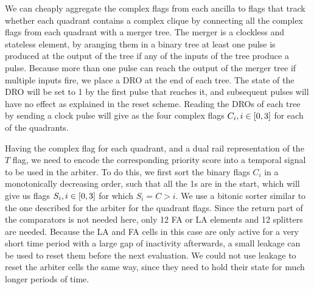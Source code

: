 \documentclass[conference]{IEEEtran}
\begin{document}
We can cheaply aggregate the complex flags from each ancilla to flags that track whether each quadrant contains a complex clique by connecting all the complex flags from each quadrant with a merger tree.
The merger is a clockless and stateless element, by aranging them in a binary tree at least one pulse is produced at the output of the tree if any of the inputs of the tree produce a pulse.
Because more than one pulse can reach the output of the merger tree if multiple inputs fire, we place a DRO at the end of each tree.
The state of the DRO will be set to 1 by the first pulse that reaches it, and subsequent pulses will have no effect as explained in the reset scheme.
Reading the DROs of each tree by sending a clock pulse will give as the four complex flags $C_i, i \in \interval{0}{3}$ for each of the quadrants.

Having the complex flag for each quadrant, and a dual rail representation of the $T$ flag, we need to encode the corresponding priority score into a temporal signal to be used in the arbiter.
To do this, we first sort the binary flags $C_i$ in a monotonically decreasing order, such that all the 1s are in the start, which will give us flags $S_i, i \in \interval{0}{3}$ for which $S_i = C > i$.
We use a bitonic sorter similar to the one described for the arbiter for the quadrant flags.
Since the return part of the comparators is not needed here, only 12 FA or LA elements and 12 splitters are needed.
Because the LA and FA cells in this case are only active for a very short time period with a large gap of inactivity afterwards, a small leakage can be used to reset them before the next evaluation.
We could not use leakage to reset the arbiter cells the same way, since they need to hold their state for much longer periods of time.
\end{document}
